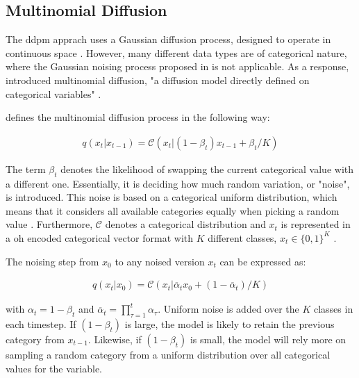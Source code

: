 \subsection{Multinomial Diffusion}
\label{ch:multinomial}
The \gls{ddpm} apprach uses a Gaussian diffusion process, designed to operate in continuous space \cite{kotelnikov2022TabDDPMModellingTabular}.
However, many different data types are of categorical nature, where the Gaussian noising process proposed in  is not applicable.
As a response, \textcite{hoogeboom2021ArgmaxFlowsMultinomial} introduced multinomial diffusion, "a diffusion \gls{model} directly defined on categorical variables" \cite[p, 3]{hoogeboom2021ArgmaxFlowsMultinomial}.

\cite{hoogeboom2021ArgmaxFlowsMultinomial} defines the multinomial diffusion process in the following way:

\begin{equation}
  \begin{align*}
    \label{eqn:mul_diff1}
    q(x_{t}|x_{t-1}) = \mathcal{C}(x_t|(1-\beta_t)x_{t-1}+\beta_t/K)
  \end{align*}
\end{equation}


The term $\beta_t$ denotes the likelihood of swapping the current categorical value with a different one. 
Essentially, it is deciding how much random variation, or "noise", is introduced.
This noise is based on a categorical uniform distribution, which means that it considers all available categories equally when picking a random value \cite{hoogeboom2021ArgmaxFlowsMultinomial}.
Furthermore, $\mathcal{C}$ denotes a categorical distribution and $x_t$ is represented in a \gls{oh} encoded categorical vector format with $K$ different classes, $x_t\in\{0,1\}^K$ \cite{hoogeboom2021ArgmaxFlowsMultinomial}.

The noising step from $x_0$ to any noised version $x_t$ can be expressed as:

\begin{equation}
  \begin{align*}
    \label{eqn:mul_diff2}
    q(x_{t}|x_{0}) = \mathcal{C}(x_t|\overline{\alpha}_tx_{0}+(1-\overline{\alpha}_t)/K)
  \end{align*}
\end{equation}

with $\alpha_t = 1-\beta_t$ and $\overline{\alpha}_t = \prod_{\tau=1}^{t}\alpha_\tau$.
Uniform noise is added over the $K$ classes in each timestep.
If $(1-\beta_t)$ is large, the \gls{model} is likely to retain the previous category from $x_{t-1}$. 
Likewise, if $(1-\beta_t)$ is small, the \gls{model} will rely more on sampling a random category from a uniform distribution over all categorical values for the variable.

